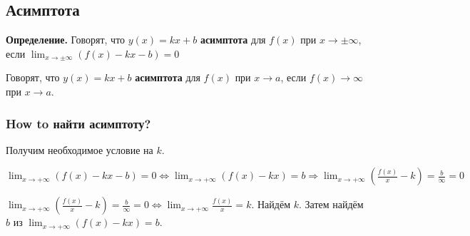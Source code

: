 \documentclass[a4paper]{article}
\begin{document}
\subsection*{Асимптота}

\textbf{Определение.} Говорят, что $y(x) = kx + b$ \textbf{асимптота} для $f(x)$ при $x \rightarrow \pm \infty$, если $\displaystyle \lim_{x \rightarrow \pm \infty} (f(x) - kx - b) = 0$

Говорят, что $y(x) = kx + b$ \textbf{асимптота} для $f(x)$ при $x \rightarrow a$, если $f(x) \rightarrow \infty$ при $x \rightarrow a$.

\subsubsection*{How to найти асимптоту?}

Получим необходимое условие на $k$.

$\displaystyle \lim_{x \rightarrow +\infty} (f(x) - kx - b) = 0 \Leftrightarrow \lim_{x \rightarrow +\infty} (f(x) - kx) = b \Rightarrow \lim_{x \rightarrow +\infty} \left( \frac{f(x)}{x} - k \right) = \frac{b}{\infty} = 0$

$\displaystyle \lim_{x \rightarrow +\infty} \left( \frac{f(x)}{x} - k \right) = \frac{b}{\infty} = 0 \Leftrightarrow \lim_{x \rightarrow +\infty} \frac{f(x)}{x} = k$. Найдём $k$. Затем найдём $b$ из $\displaystyle \lim_{x \rightarrow +\infty} (f(x) - kx) = b$.
\end{document}

